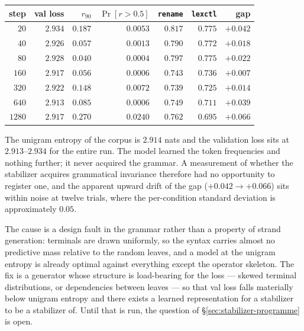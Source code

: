 \begin{center}
\begin{tabular}{rrrrrrr}
\hline
step & val loss & $r_{90}$ & $\Pr[r>0.5]$ & \texttt{rename} & \texttt{lexctl} & gap \\
\hline
$20$   & $2.934$ & $0.187$ & $0.0053$ & $0.817$ & $0.775$ & $+0.042$ \\
$40$   & $2.926$ & $0.057$ & $0.0013$ & $0.790$ & $0.772$ & $+0.018$ \\
$80$   & $2.928$ & $0.040$ & $0.0004$ & $0.797$ & $0.775$ & $+0.022$ \\
$160$  & $2.917$ & $0.056$ & $0.0006$ & $0.743$ & $0.736$ & $+0.007$ \\
$320$  & $2.922$ & $0.148$ & $0.0072$ & $0.739$ & $0.725$ & $+0.014$ \\
$640$  & $2.913$ & $0.085$ & $0.0006$ & $0.749$ & $0.711$ & $+0.039$ \\
$1280$ & $2.917$ & $0.270$ & $0.0240$ & $0.762$ & $0.695$ & $+0.066$ \\
\hline
\end{tabular}
\end{center}

\begin{observation}
\label{obs:sweep-null}
The unigram entropy of the corpus is $2.914$ nats and the validation loss sits
at $2.913$--$2.934$ for the entire run. The model learned the token frequencies
and nothing further; it never acquired the grammar. A measurement of whether
the stabilizer acquires grammatical invariance therefore had no opportunity to
register one, and the apparent upward drift of the gap
($+0.042\to+0.066$) sits within noise at twelve trials, where the per-condition
standard deviation is approximately $0.05$.
\end{observation}

The cause is a design fault in the grammar rather than a property of strand
generation: terminals are drawn uniformly, so the syntax carries almost no
predictive mass relative to the random leaves, and a model at the unigram
entropy is already optimal against everything except the operator skeleton. The
fix is a generator whose structure is load-bearing for the loss --- skewed
terminal distributions, or dependencies between leaves --- so that val loss
falls materially below unigram entropy and there exists a learned
representation for a stabilizer to be a stabilizer of. Until that is run, the
question of \S\ref{sec:stabilizer-programme} is open.


